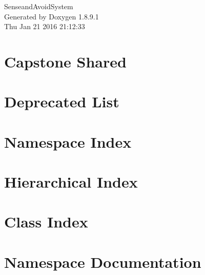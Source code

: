 \documentclass[twoside]{book}
\newcommand{\+}{\discretionary{\mbox{\scriptsize$\hookleftarrow$}}{}{}}
\newcommand{\clearemptydoublepage}{%
  \newpage{\pagestyle{empty}\cleardoublepage}%
}
\begin{document}
\hypersetup{pageanchor=false,
             bookmarks=true,
             bookmarksnumbered=true,
             pdfencoding=unicode
            }
\begin{titlepage}
\vspace*{7cm}
\begin{center}%
{\Large Senseand\+Avoid\+System }\\
\vspace*{1cm}
{\large Generated by Doxygen 1.8.9.1}\\
\vspace*{0.5cm}
{\small Thu Jan 21 2016 21:12:33}\\
\end{center}
\end{titlepage}
\clearemptydoublepage
\tableofcontents
\clearemptydoublepage
{}
\hypersetup{pageanchor=true}

\chapter{Capstone Shared}
\label{md__home_frank_dev_cpe402_saas_lib_gp_capstone-shared__r_e_a_d_m_e}
\hypertarget{md__home_frank_dev_cpe402_saas_lib_gp_capstone-shared__r_e_a_d_m_e}{}

\chapter{Deprecated List}
\label{deprecated}
\hypertarget{deprecated}{}

\chapter{Namespace Index}

\chapter{Hierarchical Index}

\chapter{Class Index}

\chapter{Namespace Documentation}







\end{document}
